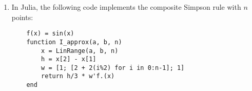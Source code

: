 \documentclass{article}
\begin{document}
\begin{enumerate}
    \item
        In Julia, the following code implements the composite Simpson rule with $n$ points:
        \begin{verbatim}
    f(x) = sin(x)
    function I_approx(a, b, n)
        x = LinRange(a, b, n)
        h = x[2] - x[1]
        w = [1; [2 + 2(i%2) for i in 0:n-1]; 1]
        return h/3 * w'f.(x)
    end
        \end{verbatim}
    \end{enumerate}
\end{document}
